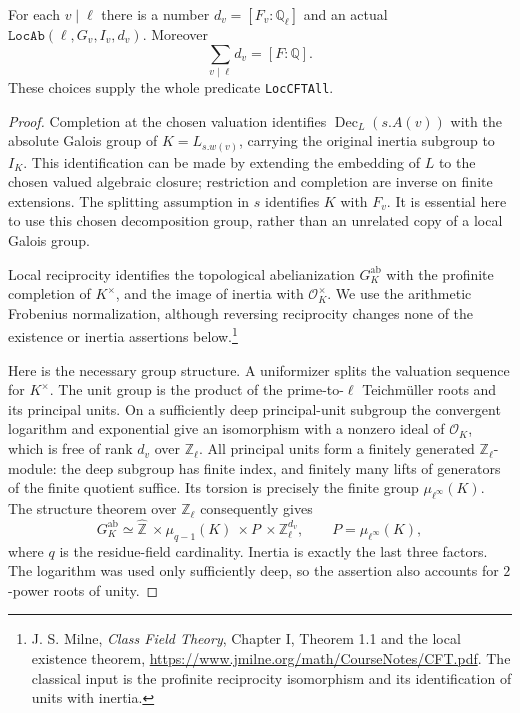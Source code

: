 \begin{theorem}
\label{claim:KX3}
For each $v\mid\ell$ there is a number
$d_v=[F_v:\mathbb Q_\ell]$ and an actual
$\texttt{LocAb}(\ell,G_v,I_v,d_v)$.  Moreover
\[
                      \sum_{v\mid\ell}d_v=[F:\mathbb Q].
                                                               \tag{KX.3}
\]
These choices supply the whole predicate \texttt{LocCFTAll}.
\end{theorem}
\begin{proof}
Completion at the chosen valuation identifies
$\operatorname{Dec}_L(s.A(v))$ with the
absolute Galois group of $K=L_{s.w(v)}$, carrying the original
inertia subgroup to $I_K$.  This identification can be made by
extending the embedding of $L$ to the chosen valued algebraic
closure; restriction and completion are inverse on finite
extensions.  The splitting assumption in $s$ identifies $K$ with
$F_v$.  It is essential here to use this chosen decomposition group,
rather than an unrelated copy of a local Galois group.

Local reciprocity identifies the topological abelianization
$G_K^{\mathrm{ab}}$ with the profinite completion of $K^\times$,
and the image of inertia with $\mathcal O_K^\times$.
We use the arithmetic Frobenius normalization, although reversing
reciprocity changes none of the existence or inertia assertions
below.\footnote{J. S. Milne, \emph{Class Field Theory},
Chapter I, Theorem 1.1 and the local existence theorem,
\url{https://www.jmilne.org/math/CourseNotes/CFT.pdf}.
The classical input is the profinite reciprocity isomorphism and
its identification of units with inertia.}

Here is the necessary group structure.  A uniformizer splits the
valuation sequence for $K^\times$.  The unit group is the product
of the prime-to-$\ell$ Teichm\"uller roots and its principal units.
On a sufficiently deep principal-unit subgroup the convergent
logarithm and exponential give an isomorphism with a nonzero ideal
of $\mathcal O_K$, which is free of rank $d_v$ over
$\mathbb Z_\ell$.  All principal units form a finitely generated
$\mathbb Z_\ell$-module: the deep subgroup has finite index, and
finitely many lifts of generators of the finite quotient suffice.
Its torsion is precisely the finite group $\mu_{\ell^\infty}(K)$.
The structure theorem over $\mathbb Z_\ell$ consequently gives
\[
 G_K^{\mathrm{ab}}\simeq
 \widehat{\mathbb Z}\ \times\mu_{q-1}(K)\ \times P\ \times
                                      \mathbb Z_\ell^{d_v},
 \qquad P=\mu_{\ell^\infty}(K),
                                                               \tag{KX.4}
\]
where $q$ is the residue-field cardinality.  Inertia is exactly the
last three factors.  The logarithm was used only sufficiently deep,
so the assertion also accounts for $2$-power roots of unity.


\end{proof}
